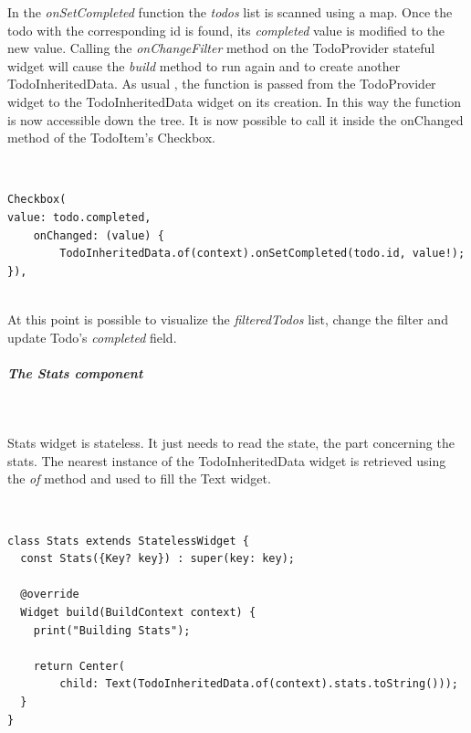 In the \textit{onSetCompleted }function the \textit{todos }list is scanned using a map. Once the todo with the corresponding id is found, its \textit{completed }value is modified to the new value. Calling the \textit{onChangeFilter }method on the TodoProvider stateful widget will cause the \textit{build}  method to run again and to create another TodoInheritedData. As usual , the function is passed from the TodoProvider widget to the TodoInheritedData widget on its creation. In this way the function is now accessible down the tree. It is now possible to call it inside the onChanged method of the TodoItem's Checkbox.


\mbox{}\\



\begin{verbatim}
Checkbox(
value: todo.completed,
    onChanged: (value) {
    	TodoInheritedData.of(context).onSetCompleted(todo.id, value!);
}),
\end{verbatim}

\mbox{}\\


At this point is possible to visualize the \textit{filteredTodos} list, change the filter and update Todo’s \textit{completed }field.


\subparagraph{The Stats component}\mbox{}\\
\label{subpar:todo_app_inherited_widget_stats_component}

Stats widget is stateless. It just needs to read the state, the part concerning the stats. The nearest instance of the TodoInheritedData widget is retrieved using the \textit{of} method and used to fill the Text widget.


\mbox{}\\


\begin{verbatim}
class Stats extends StatelessWidget {
  const Stats({Key? key}) : super(key: key);

  @override
  Widget build(BuildContext context) {
    print("Building Stats");

    return Center(
        child: Text(TodoInheritedData.of(context).stats.toString()));
  }
}
\end{verbatim}


